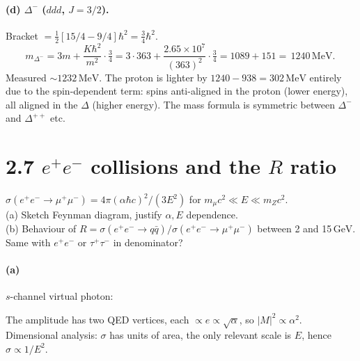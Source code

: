 \documentclass[11pt]{article}
\newcommand{\Q}[1]{\begin{question}#1\end{question}}
\newcommand{\MeV}{\,\mathrm{MeV}}
\newcommand{\GeV}{\,\mathrm{GeV}}
\begin{document}
\paragraph{(d) $\Delta^-$ ($ddd$, $J=3/2$).} Bracket $=\tfrac12[15/4-9/4]\hbar^{2}=\tfrac34\hbar^{2}$.
\[
m_{\Delta^-}=3m+\frac{K\hbar^{2}}{m^{2}}\cdot\tfrac34 = 3\cdot 363+\frac{2.65\times 10^{7}}{(363)^{2}}\cdot\tfrac34 = 1089+151=\boxed{\,1240\MeV.\,}
\]
Measured $\sim 1232\MeV$. The proton is lighter by $1240-938=302\MeV$ entirely due to the spin-dependent term: spins anti-aligned in the proton (lower energy), all aligned in the $\Delta$ (higher energy). The mass formula is symmetric between $\Delta^-$ and $\Delta^{++}$ etc.

\section*{2.7 \quad $e^+e^-$ collisions and the $R$ ratio}

\Q{$\sigma(e^+e^-\to\mu^+\mu^-)=4\pi(\alpha\hbar c)^{2}/(3 E^{2})$ for $m_\mu c^{2}\ll E\ll m_Z c^{2}$.\\
(a) Sketch Feynman diagram, justify $\alpha,E$ dependence.\\
(b) Behaviour of $R=\sigma(e^+e^-\to q\bar q)/\sigma(e^+e^-\to\mu^+\mu^-)$ between 2 and 15$\GeV$. Same with $e^+e^-$ or $\tau^+\tau^-$ in denominator?}

\paragraph{(a)} $s$-channel virtual photon:
\begin{center}
\end{center}
The amplitude has two QED vertices, each $\propto e\propto\sqrt{\alpha}$, so $|M|^{2}\propto\alpha^{2}$. Dimensional analysis: $\sigma$ has units of area, the only relevant scale is $E$, hence $\sigma\propto 1/E^{2}$.
\end{document}
